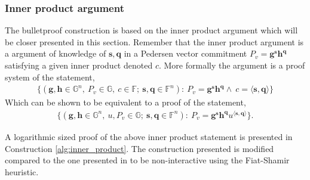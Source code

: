 \subsubsection*{Inner product argument}
\label{sec:inner_prod}
The bulletproof construction is based on the inner product argument which will be closer presented in this section. Remember that the inner product argument is a argument of knowledge of $\textbf{s},\mathbf{q}$ in a  Pedersen vector commitment $P_v=\mathbf{g}^\mathbf{s}\mathbf{h}^\mathbf{q}$ satisfying a given inner product denoted $c$. 
More formally the argument is a proof system of the statement,
\begin{align*}
    \{(\mathbf{g},\mathbf{h}\in\mathds{G}^n,\:P_v\in\mathds{G},\:c\in\mathds{F};\: \mathbf{s},\mathbf{q}\in\mathds{F}^n) : \: P_v=\mathbf{g}^\mathbf{s}\mathbf{h}^\mathbf{q}\wedge\: c =\langle\mathbf{s},\mathbf{q}\rangle\}
\end{align*}
Which can be shown to be equivalent to a proof of the statement,
\begin{align}
\label{eq:IPA}
    \{(\mathbf{g},\mathbf{h}\in\mathds{G}^n,\: u,P_v\in\mathds{G};\: \mathbf{s},\mathbf{q}\in\mathds{F}^n) : \: P_v=\mathbf{g}^\mathbf{s}\mathbf{h}^\mathbf{q}u^{\langle\mathbf{s},\mathbf{q}\rangle}\}.
\end{align}

A logarithmic sized proof of the above inner product statement is presented in Construction \ref{alg:inner_product}. The construction presented is modified compared to the one presented in \cite{bulletProofs_theory} to be non-interactive using the Fiat-Shamir heuristic.

